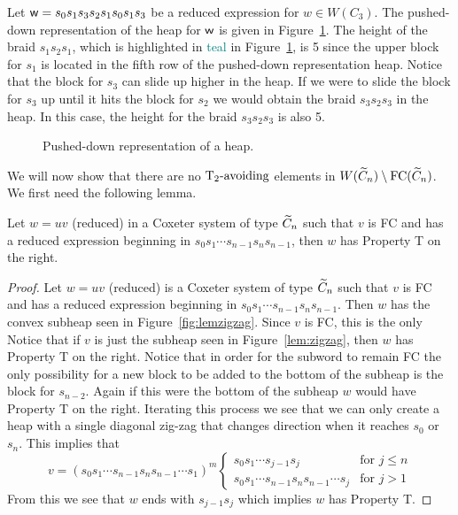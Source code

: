 \begin{example}
Let $\mathsf{w}=s_0s_1s_3s_2s_1s_0s_1s_3$ be a reduced expression for $w \in W(C_3)$. The pushed-down representation of the heap for $\mathsf{w}$ is given in Figure~\ref{fig:pusheddownheap}. The height of the braid $s_1s_2s_1$, which is highlighted in \textcolor{teal}{teal} in Figure~\ref{fig:pusheddownheap}, is 5 since the upper block for $s_1$ is located in the fifth row of the pushed-down representation heap. Notice that the block for $s_3$ can slide up higher in the heap. If we were to slide the block for $s_3$ up until it hits the block for $s_2$ we would obtain the braid $s_3s_2s_3$ in the heap. In this case, the height for the braid $s_3s_2s_3$ is also 5.   

\begin{figure}[h!] \centering
{}	
\caption{Pushed-down representation of a heap.}\label{fig:pusheddownheap}
\end{figure}
\end{example}

We will now show that there are no $\operatorname{T_2-\mathrm{avoiding}}$ elements in $W(\widetilde{C}_n) \setminus \mathrm{FC}(\widetilde{C}_n)$. We first need the following lemma.

\begin{lemma}\label{lem:zigzag}
Let $w=uv$ (reduced) in a Coxeter system of type $\widetilde{C}_n$ such that $v$ is FC and has a reduced expression beginning in $s_0s_1\cdots s_{n-1}s_ns_{n-1}$, then $w$ has Property T on the right.
\begin{proof}
	Let $w=uv$ (reduced) is a Coxeter system of type $\widetilde{C}_n$ such that $v$ is FC and has a reduced expression beginning in $s_0s_1 \cdots s_{n-1}s_ns_{n-1}$. Then $w$ has the convex subheap seen in Figure~\ref{fig:lemzigzag}. Since $v$ is FC, this is the only Notice that if $v$ is just the subheap seen in Figure~\ref{lem:zigzag}, then $w$ has Property T on the right. Notice that in order for the subword to remain FC the only possibility for a new block to be added to the bottom of the subheap is the block for $s_{n-2}$. Again if this were the bottom of the subheap $w$ would have Property T on the right. Iterating this process we see that we can only create a heap with a single diagonal zig-zag that changes direction when it reaches $s_0$ or $s_n$. This implies that 
	\[
		v=(s_0s_1 \cdots s_{n-1}s_ns_{n-1} \cdots s_1)^m 
		\begin{cases}
 			s_0s_1 \cdots s_{j-1}s_j & \text{for } j \leq n\\
 			s_0s_1 \cdots s_{n-1}s_ns_{n-1} \cdots s_j & \text{for } j> 1
		\end{cases}
	\]  
	From this we see that $w$ ends with $s_{j-1}s_j$ which implies $w$ has Property T.
\end{proof}
\end{lemma}

